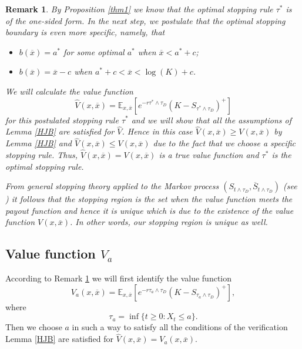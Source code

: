 \documentclass[10pt]{amsart}
\def\E{{\mathbb{E}}}
\def \R{{{\rm I{\!}\rm R}}}
\def\E{{\mathbb E}} \def\PP{\mc P} \def\Z{{\mathbb Z}} \def\R{{\mathbb R}}
\newtheorem{Rem}{Remark} \newtheorem{Exc}{Exercise}
\begin{document}
	\begin{Rem}\label{uwaga2}
		\rm
		By Proposition \ref{thm1} we know that the optimal stopping rule $\tau^*$
		is of the one-sided form. In the next step, we postulate that the optimal
		stopping boundary is even more specific, namely, that
		\begin{itemize}
			\item $b(\overline{x})=a^*$ for some optimal $a^*$ when $\overline{x} < a^* + c$;
			\item $b(\overline{x})=\overline{x}-c$ when $a^* + c <  \overline{x} < \log(K)+c$.
		\end{itemize}
		We will calculate the value function
		\begin{equation*}
			\hat{V}(x, \overline{x})=\E_{x,\overline{x}} [e^{-r\tau^*\wedge\tau_D}(K - S_{\tau^*\wedge\tau_D})^+]
		\end{equation*}
		for this postulated stopping rule  $\tau^*$ and we will show that all the assumptions of Lemma \ref{HJB}
		are satisfied for $\hat{V}$. Hence in this case
		$\hat{V}(x, \overline{x})\geq V(x, \overline{x})$  by  Lemma \ref{HJB} and $\hat{V}(x, \overline{x})\leq V(x, \overline{x})$ due to the fact that
we choose a specific stopping rule. Thus, $\hat{V}(x, \overline{x})=V(x, \overline{x})$ is a true value function
and $\tau^*$ is the optimal stopping rule.
		
		
		From general stopping theory applied to the Markov process $(S_{t\wedge \tau_D}, \overline{S}_{t\wedge \tau_D})$
		(see \cite[Thm. 2.7, p. 40 and (2.2.80), p. 49]{PS}) it follows that the stopping region is the set when the value function meets the payout function
		and hence it is unique which is due to the existence of the value function
		$V(x, \overline{x})$. In other words, our stopping region is unique as well.
		
	\end{Rem}
	
	\subsection{Value function $V_a$}
	According to Remark \ref{uwaga2} we will first identify the value function
	\begin{equation*}%
		V_a(x, \overline{x}) = \E_{x,\overline{x}} \left[e^{-r\tau_a\wedge\tau_D}(K - S_{\tau_a\wedge\tau_D})^+\right],
	\end{equation*}
	where
	\begin{equation}\label{taua}
		\tau_a = \inf\{ t \geq 0: X_t \leq a \}.
	\end{equation}
	Then we choose $a$ in such a way to satisfy all the conditions of the verification Lemma \ref{HJB}
	are satisfied for $\hat{V}(x, \overline{x})=V_{a}(x, \overline{x})$.
	
\end{document}
